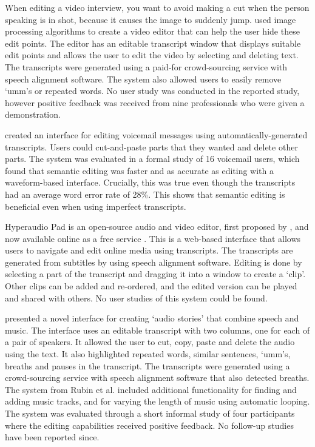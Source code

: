 When editing a video interview, you want to avoid making a cut when the person speaking is in shot, because it causes
the image to suddenly jump.  \citet{Berthouzoz2012} used image processing algorithms to create a video editor that can
help the user hide these edit points. The editor has an editable transcript window that displays suitable edit points
and allows the user to edit the video by selecting and deleting text. The transcripts were generated using a paid-for
crowd-sourcing service with speech alignment software. The system also allowed users to easily remove `umm's or
repeated words. No user study was conducted in the reported study, however positive feedback was received from nine
professionals who were given a demonstration.

\citet{Whittaker2004} created an interface for editing voicemail messages using automatically-generated transcripts.
Users could cut-and-paste parts that they wanted and delete other parts.  The system was evaluated in a formal study of
16 voicemail users, which found that semantic editing was faster and as accurate as editing with a waveform-based
interface. Crucially, this was true even though the transcripts had an average word error rate of 28\%. This shows that
semantic editing is beneficial even when using imperfect transcripts.

Hyperaudio Pad is an open-source audio and video editor, first proposed by \citet{Boas2011}, and now available online
as a free service \citep{Hyperaudio2016}. This is a web-based interface that allows users to navigate and edit online
media using transcripts. The transcripts are generated from subtitles by using speech alignment software. Editing is
done by selecting a part of the transcript and dragging it into a window to create a `clip'.  Other clips can be added
and re-ordered, and the edited version can be played and shared with others. No user studies of this system could be
found.

\citet{Rubin2013} presented a novel interface for creating `audio stories' that combine speech and music. The interface
uses an editable transcript with two columns, one for each of a pair of speakers.  It allowed the user to cut, copy,
paste and delete the audio using the text. It also highlighted repeated words, similar sentences, `umm's, breaths and
pauses in the transcript. The transcripts were generated using a crowd-sourcing service with speech alignment software
that also detected breaths.  The system from Rubin et al. included additional functionality for finding and adding
music tracks, and for varying the length of music using automatic looping. The system was evaluated through a short
informal study of four participants where the editing capabilities received positive feedback. No follow-up studies
have been reported since.

